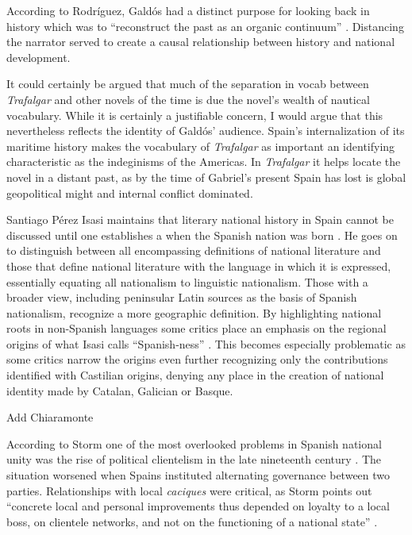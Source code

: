 \documentclass[12pt]{report}
\begin{document}
According to Rodríguez, Galdós had a distinct purpose for looking back in history which was to \enquote{reconstruct the past as an organic continuum} \cite[28]{Rodriguez1967}.
Distancing the narrator served to create a causal relationship between history and national development.


It could certainly be argued that much of the separation in vocab between \textit{Trafalgar} and other novels of the time is due the novel's wealth of nautical vocabulary.
While it is certainly a justifiable concern, I would argue that this nevertheless reflects the identity of  Galdós' audience.
Spain's internalization of its maritime history makes the vocabulary of \textit{Trafalgar} as important an identifying characteristic as the indeginisms of the Americas.
In \textit{Trafalgar} it helps locate the novel in a distant past, as by the time of Gabriel's present Spain has lost is global geopolitical might and internal conflict dominated.


Santiago Pérez Isasi maintains that literary national history in Spain cannot be discussed until one establishes a when the Spanish nation was born \cite[172]{Isasi2013}.
He goes on to distinguish between all encompassing definitions of national literature and those that define national literature with the language in which it is expressed, essentially equating all nationalism to linguistic nationalism. 
Those with a broader view, including peninsular Latin sources as the basis of Spanish nationalism, recognize a more geographic definition.
By highlighting national roots in non-Spanish languages some critics place an emphasis on the regional origins of what Isasi calls \enquote{Spanish-ness} \cite[173]{Isasi2013}.
This becomes especially problematic as some critics narrow the origins even further recognizing only the contributions identified with Castilian origins, denying any place in the creation of national identity made by Catalan, Galician or Basque.


Add Chiaramonte

According to Storm one of the most overlooked problems in Spanish national unity was the rise of political clientelism in the late nineteenth century \cite[147]{Storm2004}.
The situation worsened when Spains instituted alternating governance between two parties.
Relationships with local \textit{caciques} were critical, as Storm points out \enquote{concrete local and personal improvements thus depended on loyalty to a local boss, on clientele networks, and not on the functioning of a national state} \cite[148]{Storm2004}.
\end{document}
